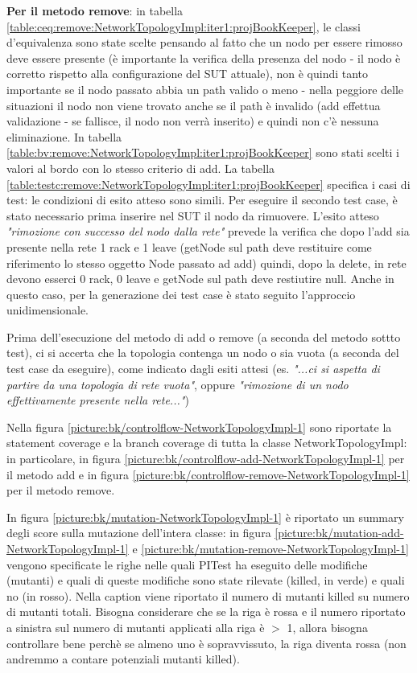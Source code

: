 \documentclass[10pt, a4paper]{article}
\newcommand{\gettablelabel}[5]{table:#1:#2:#3:iter#4:proj#5}
\newcommand{\getpicturelabel}[1]{picture:#1}
\def\bookkeeper{BookKeeper}
\begin{document}
	\textbf{Per il metodo remove}: in tabella \ref{\gettablelabel{ceq}{remove}{NetworkTopologyImpl}{1}
	{\bookkeeper}}, le classi d'equivalenza sono state scelte pensando al fatto che un nodo per essere
	rimosso deve essere presente (è importante la verifica della presenza del nodo - il nodo è corretto rispetto
	alla configurazione del SUT attuale), non è quindi tanto 
	importante se il nodo passato abbia un path valido
	o meno - nella peggiore delle situazioni il nodo non viene trovato anche se il path è invalido (add 
	effettua validazione - se fallisce, il nodo non verrà inserito) e quindi non c'è nessuna 
	eliminazione.
	In tabella \ref{\gettablelabel{bv}{remove}{NetworkTopologyImpl}{1}{\bookkeeper}} sono stati scelti i valori al
	bordo con lo stesso criterio di add.
	La tabella \ref{\gettablelabel{testc}{remove}{NetworkTopologyImpl}{1}{\bookkeeper}} specifica i casi di test:
	le condizioni di esito atteso sono simili. Per eseguire il secondo test case, è stato necessario
	prima inserire nel SUT il nodo da rimuovere. L'esito atteso \textit{"rimozione con successo
	del nodo dalla rete"} prevede la verifica che dopo l'add sia presente nella rete 1 rack e 1 leave 
	(getNode sul path deve restituire come riferimento lo stesso oggetto Node passato ad add)
	quindi, dopo la delete, in rete devono esserci 0 rack, 0 leave e getNode sul path deve restiutire 
	null. Anche in questo caso, per la
	generazione dei test case è stato seguito l'approccio unidimensionale.
	
	Prima dell'esecuzione del metodo di add o remove (a seconda del metodo sottto test), ci si accerta 	
	che la topologia contenga un nodo o sia vuota (a seconda del test case da eseguire), come indicato
	dagli esiti attesi (es. \textit{"...ci si aspetta di partire da una topologia di rete vuota"}, 
	oppure \textit{"rimozione di un nodo effettivamente presente nella rete..."})
		
	Nella figura \ref{\getpicturelabel{bk/controlflow-NetworkTopologyImpl-1}} sono riportate la
	statement coverage e la branch coverage di tutta la classe NetworkTopologyImpl: in particolare,
	in figura \ref{\getpicturelabel{bk/controlflow-add-NetworkTopologyImpl-1}} per il metodo add e in
	figura \ref{\getpicturelabel{bk/controlflow-remove-NetworkTopologyImpl-1}} per il metodo remove.
	
	In figura \ref{\getpicturelabel{bk/mutation-NetworkTopologyImpl-1}} è riportato un summary degli
	score sulla mutazione dell'intera classe: in figura \ref{\getpicturelabel{bk/mutation-add-NetworkTopologyImpl-1}} 
	e \ref{\getpicturelabel{bk/mutation-remove-NetworkTopologyImpl-1}} vengono
	specificate le righe nelle quali PITest ha eseguito delle modifiche (mutanti) e quali di queste 
	modifiche sono state rilevate (killed, in verde) e quali no (in rosso). Nella caption viene 
	riportato
	il numero di mutanti killed su numero di mutanti totali. Bisogna considerare che se la riga è rossa
	e il numero riportato a sinistra sul numero di mutanti applicati alla riga è $>$ 1, allora bisogna
	controllare bene perchè se almeno uno è sopravvissuto, la riga diventa rossa (non andremmo a contare
	potenziali mutanti killed).
	
\end{document}
